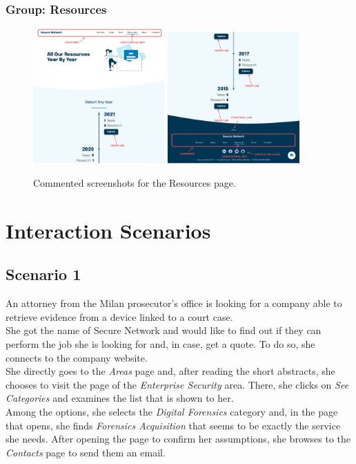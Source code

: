 \documentclass[12pt]{report}
\begin{document}
\subsection{Group: Resources}

\begin{figure}[H]
	\centering
	\includegraphics[width=0.45\textwidth]{high_fid_wireframes/all_resources/1.png}
	\includegraphics[width=0.45\textwidth]{high_fid_wireframes/all_resources/2.png}
	\caption{Commented screenshots for the Resources page.}
\end{figure}

\chapter{Interaction Scenarios}

\section{Scenario 1}
An attorney from the Milan prosecutor's office is looking for a company able to retrieve evidence from a device linked to a court case.\\
\noindent
She got the name of Secure Network and would like to find out if they can perform the job she is looking for and, in case, get a quote.
To do so, she connects to the company website.\\
\noindent
She directly goes to the \emph{Areas} page and, after reading the short abstracts, she chooses to visit the page of the \emph{Enterprise Security} area.
There, she clicks on \emph{See Categories} and examines the list that is shown to her.\\
\noindent
Among the options, she selects the \emph{Digital Forensics} category and, in the page that opens, she finds \emph{Forensics Acquisition} that seems to be exactly the service she needs.
After opening the page to confirm her assumptions, she browses to the \emph{Contacts} page to send them an email.
\end{document}
